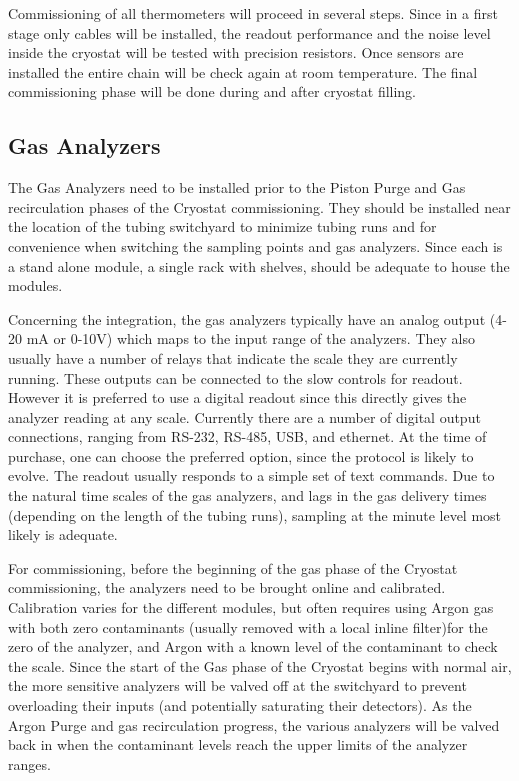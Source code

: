 Commissioning of all thermometers will proceed in several steps. Since in a first stage only cables will be installed,
the readout performance and the noise level inside the cryostat will be
tested with precision resistors. Once sensors are installed the entire chain will be check again at room temperature.
The final commissioning phase will be done during and after cryostat filling.  


\subsection{Gas Analyzers}
\label{sec:fdsp-slow-cryo-install-ga}
 
The Gas Analyzers need to be installed prior to the Piston Purge and Gas recirculation phases of the Cryostat commissioning. They should be installed near the location of the tubing switchyard to minimize tubing runs and for convenience when switching the sampling points and gas analyzers. Since each is a stand alone module, a single rack with shelves, should be adequate to house the modules.

Concerning the integration, the gas analyzers typically have an analog output (4-20 \si{mA} or 0-10\si{V}) which maps to the input range of the analyzers. They also usually have a number of relays that indicate the scale they are currently running. These outputs can be connected to the slow controls for readout. However it is preferred to use a digital readout since this directly gives the analyzer reading at any scale. Currently there are a number of digital output connections, ranging from RS-232, RS-485, USB, and ethernet. At the time of purchase, one can choose the preferred option, since the protocol is likely to evolve. The readout usually responds to a simple set of text commands. Due to the natural time scales of the gas analyzers, and lags in the gas delivery times (depending on the length of the tubing runs), sampling at the minute level most likely is adequate.

For commissioning, before the beginning of the gas phase of the Cryostat commissioning, the analyzers need to be brought online and calibrated. Calibration varies for the different modules, but often requires using Argon gas with both zero contaminants (usually removed with a local inline filter)for the zero of the analyzer, and Argon with a known level of the contaminant to check the scale. Since the start of the Gas phase of the Cryostat begins with normal air, the more sensitive analyzers will be valved off at the switchyard to prevent overloading their inputs (and potentially saturating their detectors). As the Argon Purge and gas recirculation progress, the various analyzers will be valved back in when the contaminant levels reach the upper limits of the analyzer ranges. 

